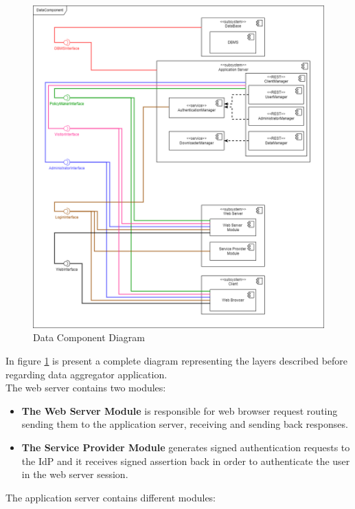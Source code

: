 \begin{figure}[h!]
        \centering
        \includegraphics[scale=0.40]{images/component_diagrams/data_component_diagram.png}
        \caption{Data Component Diagram}
        \label{fig:data_component_diagram}
\end{figure}
\FloatBarrier
In figure \ref{fig:data_component_diagram} is present a complete diagram representing the layers described before regarding data aggregator application.\\
The web server contains two modules:
\begin{itemize}
    \item \textbf{The Web Server Module} is responsible for web browser request routing sending them to the application server, receiving and sending back responses.
    \item \textbf{The Service Provider Module} generates signed authentication requests to the IdP and it receives signed assertion back in order to authenticate the user in the web server session.
\end{itemize}
The application server contains different modules:
